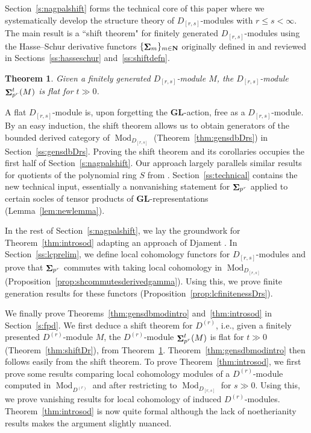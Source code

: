 \documentclass[12pt]{amsart}
\newcommand{\bN}{\mathbf{N}}
\DeclareMathOperator{\Mod}{Mod}
\DeclareMathOperator{\Sh}{\bf{\Sigma}}
\newcommand{\Dr}{D^{(r)}}
\newcommand{\Drs}{D_{[r,s]}}
\newcommand{\GL}{\mathbf{GL}}
\numberwithin{equation}{section}
\theoremstyle{definition}
\theoremstyle{plain}
\newtheorem{mainthm}{Theorem}
\begin{document}
Section~\ref{s:nagpalshift} forms the technical core of this paper where we systematically develop the structure theory of $\Drs$-modules with $r \leq s < \infty$. The main result is a ``shift theorem" for finitely generated $\Drs$-modules using the Hasse--Schur derivative functors $\{\Sh_m\}_{m \in \bN}$ originally defined in \cite{gan25pol} and reviewed in Sections~\ref{ss:hasseschur} and~\ref{ss:shiftdefn}.
\begin{mainthm}\label{thm:shiftintro}
Given a finitely generated $\Drs$-module $M$, the $\Drs$-module $\Sh_{p^r}^t(M)$ is flat for $t \gg 0$.  
\end{mainthm}
A flat $\Drs$-module is, upon forgetting the $\GL$-action, free as a $\Drs$-module. By an easy induction, the shift theorem allows us to obtain generators of the bounded derived category of $\Mod_{\Drs}$ (Theorem~\ref{thm:gensdbDrs}) in Section~\ref{ss:gensdbDrs}. Proving the shift theorem and its corollaries occupies the first half of Section~\ref{s:nagpalshift}. Our approach largely parallels similar results for quotients of the polynomial ring $S$ from \cite[Section~5]{gan25pol}. Section~\ref{ss:technical} contains the new technical input, essentially a nonvanishing statement for $\Sh_{p^r}$ applied to certain socles of tensor products of $\GL$-representations (Lemma~\ref{lem:newlemma}).

In the rest of Section~\ref{s:nagpalshift}, we lay the groundwork for Theorem~\ref{thm:introsod} adapting an approach of Djament \cite[Appendix~A]{dj16lc}. In Section~\ref{ss:lcprelim}, we define local cohomology functors for $\Drs$-modules and prove that $\Sh_{p^r}$ commutes with taking local cohomology in $\Mod_{\Drs}$ (Proposition~\ref{prop:shcommutesderivedgamma}). Using this, we prove finite generation results for these functors (Proposition~\ref{prop:lcfinitenessDrs}).   

We finally prove Theorems~\ref{thm:gensdbmodintro} and~\ref{thm:introsod} in Section~\ref{s:fpd}. We first deduce a shift theorem for $\Dr$, i.e., given a finitely presented $\Dr$-module $M$, the $\Dr$-module $\Sh_{p^r}^t(M)$ is flat for $t \gg 0$ (Theorem~\ref{thm:shiftDr}), from Theorem~\ref{thm:shiftintro}. Theorem~\ref{thm:gensdbmodintro} then follows easily from the shift theorem. To prove Theorem~\ref{thm:introsod}, we first prove some results comparing local cohomology modules of a $\Dr$-module computed in $\Mod_{\Dr}$ and after restricting to $\Mod_{\Drs}$ for $s \gg 0$. Using this, we prove vanishing results for local cohomology of induced $\Dr$-modules. Theorem~\ref{thm:introsod} is now quite formal although the lack of noetherianity results makes the argument slightly nuanced.
\end{document}
